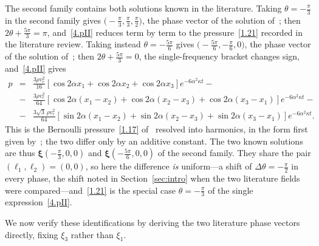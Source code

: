 \documentclass[11pt]{jfm}
\numberwithin{equation}{section}
\begin{document}
The second family contains both solutions known in the literature. Taking
$\theta=-\tfrac{\pi}{3}$ in the second family gives
$\bigl(-\tfrac{\pi}{3},\tfrac{\pi}{3},\tfrac{\pi}{2}\bigr)$, the phase vector of the solution
of~\cite{tha4}; then $2\theta+\tfrac{5\pi}{3}=\pi$, and~\eqref{4.pII} reduces term by term to the
pressure~\eqref{1.21} recorded in the literature review. Taking instead
$\theta=-\tfrac{5\pi}{6}$ gives $\bigl(-\tfrac{5\pi}{6},-\tfrac{\pi}{6},0\bigr)$, the phase vector
of the solution of~\cite{ant}; then $2\theta+\tfrac{5\pi}{3}=0$, the single-frequency bracket
changes sign, and~\eqref{4.pII} gives
\begin{eqnarray}
\label{4.p4}
p&=&\frac{3\rho v_r^2}{16}\left[\cos 2\alpha x_1+\cos 2\alpha x_2+\cos 2\alpha x_3\right]e^{-6\alpha^2\kappa t}-\nonumber\\
 &-&\frac{3\rho v_r^2}{64}\left[\cos 2\alpha(x_1-x_2)+\cos 2\alpha(x_2-x_3)+\cos 2\alpha(x_3-x_1)\right]e^{-6\alpha^2\kappa t}-\nonumber\\
 &-&\frac{3\sqrt{3}\,\rho v_r^2}{64}\left[\sin 2\alpha(x_1-x_2)+\sin 2\alpha(x_2-x_3)+\sin 2\alpha(x_3-x_1)\right]e^{-6\alpha^2\kappa t}.
\end{eqnarray}
This is the Bernoulli pressure~\eqref{1.17} of~\citet{ant} resolved into harmonics, in the form
first given by~\citet{tha4}; the two differ only by an additive constant. The two known solutions are thus $\boldsymbol{\xi}(-\tfrac{\pi}{3},0,0)$ and
$\boldsymbol{\xi}(-\tfrac{5\pi}{6},0,0)$ of the second family. They share the pair
$(\ell_1,\ell_2)=(0,0)$, so here the difference \emph{is} uniform---a shift of
$\Delta\theta=-\tfrac{\pi}{2}$ in every phase, the shift noted in Section~\ref{sec:intro} when the
two literature fields were compared---and~\eqref{1.21} is the special case $\theta=-\tfrac{\pi}{3}$
of the single expression~\eqref{4.pII}.

We now verify these identifications by deriving the two literature phase vectors directly, fixing
$\xi_3$ rather than $\xi_1$.
\end{document}

